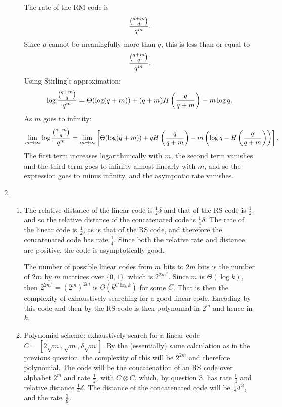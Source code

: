 \documentclass[11pt]{article} \usepackage{amssymb}
\newcommand{\half}{{\textstyle \frac12}}
\newcommand{\fourth}{{\textstyle \frac14}}
\begin{document}
\begin{enumerate}
\begin{enumerate}
The rate of the RM code is
\begin{equation*}
  {{d+m\choose d}\over q^m}.
\end{equation*}
Since $d$ cannot be meaningfully more than $q$, this is less than or equal to
\begin{equation*}
  {{q+m\choose q}\over q^m}.
\end{equation*}
Using Stirling's approximation:
\begin{equation*}
  \log{{q+m\choose q}\over q^m}=
  \Theta(\log(q+m))+(q+m)H\left({q\over q+m}\right)-m\log q.
\end{equation*}
As $m$ goes to infinity:
\begin{equation*}
  \lim_{m\to\infty}\log{{q+m\choose q}\over q^m}=
  \lim_{m\to\infty}\left[\Theta(\log(q+m))+qH\left({q\over q+m}\right)-m\left(\log q-H\left({q\over q+m}\right)\right)\right].
\end{equation*}
The first term increases logarithmically with $m$, the second term vanishes
and the third term goes to infinity almost linearly with $m$, and so the 
expression goes to minus infinity, and the asymptotic rate vanishes.
\end{enumerate}
\item
\begin{enumerate}
\item 
The relative distance of the linear code is $\half \delta$ and that
of the RS code is $\half$, and so the relative distance of the 
concatenated code is $\fourth\delta$. The rate of the linear code is 
$\half$, as is that of the RS code, and therefore the concatenated code
has rate $\fourth$. Since both the relative rate and distance are
positive, the code is asymptotically good.

The number of possible linear codes from $m$ bits to $2m$ bits is
the number of $2m$ by $m$ matrices over $\{0,1\}$, which is $2^{2m^2}$. Since 
$m$ is $\Theta(\log k)$, then $2^{2m^2}=\left(2^{m}\right)^{2m}$ is $\Theta(k^{C\log k})$ for some $C$. That
is then the complexity of exhaustively searching for a good
linear code. Encoding by this code and then by the RS code is then
polynomial in $2^m$ and hence in $k$.
\item
Polynomial scheme: exhaustively search for a 
linear code $C=[2\sqrt{m},\sqrt{m},\delta \sqrt{m}]$. By the (essentially) same calculation
as in the previous question, the complexity of this will be $2^{2m}$ 
and therefore polynomial. 
The code will be the concatenation of an RS code over alphabet $2^m$ and rate
$\half$, with 
$C\otimes C$, which, by question 3, has rate $\fourth$ and relative 
distance $\fourth\delta$. The distance of the concatenated code 
will be ${1\over 8}\delta^2$, and the rate ${1\over 8}$.
\end{enumerate}

\end{enumerate}
\end{document}
